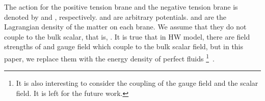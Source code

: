 \documentclass[a4paper,11pt]{article}
\begin{document}
The action for the positive tension brane and the negative tension brane 
is denoted by \coordHE{} and \coordHE{}, respectively.  
\coordHE{} and \coordHE{} are arbitrary potentials. 
\coordHE{} and \coordHE{} 
are the Lagrangian density of the matter on each brane. 
We assume that they do not couple to the bulk scalar, that is, 
\coordHE{}.  
It is true that in HW model, there are  
field strengths of \coordHE{} and \coordHE{} gauge field which couple to 
the bulk scalar field, but in this paper, we replace them 
with the energy density of perfect fluids  
\footnote{
It is also interesting to consider the coupling of the gauge 
field and the scalar field. It is left for the 
future work. 
}\ . 
\end{document}
